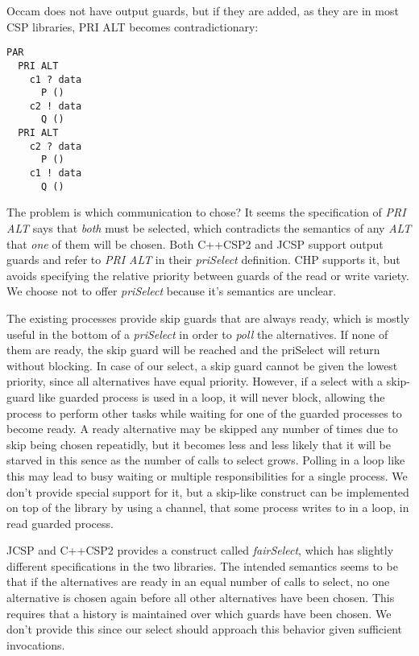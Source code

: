 \documentclass[a4paper,12pt]{article}
\begin{document}
Occam does not have output guards, but if they are added, as they
are in most CSP libraries, PRI ALT becomes contradictionary:
\begin{verbatim}
PAR
  PRI ALT
    c1 ? data
      P ()
    c2 ! data
      Q ()
  PRI ALT
    c2 ? data
      P ()
    c1 ! data
      Q ()
\end{verbatim}

The problem is which communication to chose? It seems the specification of
\emph{PRI ALT} says that \emph{both} must be selected, which contradicts the
semantics of any \emph{ALT} that \emph{one} of them will be chosen.
Both C++CSP2 and JCSP support output guards and refer to \emph{PRI ALT} in their
\emph{priSelect} definition. CHP supports it, but avoids specifying the
relative priority between guards of the read or write variety. We choose not to
offer \emph{priSelect} because it's semantics are unclear.

The existing processes provide skip guards that are always ready, which is
mostly useful in the bottom of a \emph{priSelect} in order to \emph{poll} the
alternatives. If none of them are ready, the skip guard will be reached and the
priSelect will return without blocking. In case of our select, a skip guard
cannot be given the lowest priority, since all alternatives have equal
priority. However, if a select with a skip-guard like guarded process is used
in a loop, it will never block, allowing the process to perform other tasks
while waiting for one of the guarded processes to become ready. A ready
alternative may be skipped any number of times due to skip being chosen
repeatidly, but it becomes less and less likely that it will be starved in this
sence as the number of calls to select grows. Polling in a loop like this may
lead to busy waiting or multiple responsibilities for a single process. We
don't provide special support for it, but a skip-like construct can be
implemented on top of the library by using a channel, that some process writes
to in a loop, in read guarded process.

JCSP and C++CSP2 provides a construct called \emph{fairSelect}, which has
slightly different specifications in the two libraries. The intended semantics
seems to be that if the alternatives are ready in an equal number of calls to
select, no one alternative is chosen again before all other alternatives have
been chosen. This requires that a history is maintained over which guards have
been chosen. We don't provide this since our select should approach this
behavior given sufficient invocations.
\end{document}

